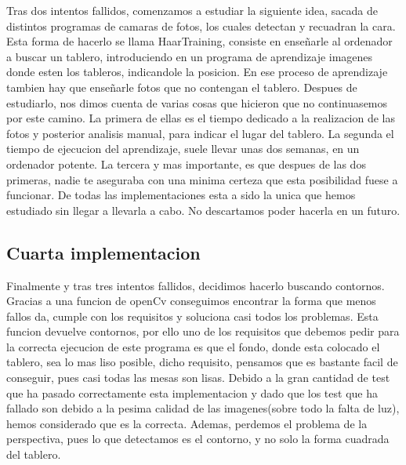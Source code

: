 \documentclass[12pt,a4paper]{report}
\begin{document}
Tras dos intentos fallidos, comenzamos a estudiar la siguiente idea, sacada de distintos programas de camaras de fotos, los cuales detectan y recuadran la cara. 
Esta forma de hacerlo se llama HaarTraining, consiste en enseñarle al ordenador a buscar un tablero, introduciendo en un programa de aprendizaje imagenes donde esten los tableros, indicandole la posicion. En ese proceso de aprendizaje tambien hay que enseñarle fotos que no contengan el tablero.
Despues de estudiarlo, nos dimos cuenta de varias cosas que hicieron que no continuasemos por este camino.
La primera de ellas es el tiempo dedicado a la realizacion de las fotos y posterior analisis manual, para indicar el lugar del tablero.
La segunda el tiempo de ejecucion del aprendizaje, suele llevar unas dos semanas, en un ordenador potente.
La tercera y mas importante, es que despues de las dos primeras, nadie te aseguraba con una minima certeza que esta posibilidad fuese a funcionar.
De todas las implementaciones esta a sido la unica que hemos estudiado sin llegar a llevarla a cabo. No descartamos poder hacerla en un futuro.

\subsection{Cuarta implementacion}

Finalmente y tras tres intentos fallidos, decidimos hacerlo buscando contornos. Gracias a una funcion de openCv conseguimos encontrar la forma que menos fallos da, cumple con los requisitos y soluciona casi todos los problemas.
Esta funcion devuelve contornos, por ello uno de los requisitos que debemos pedir para la correcta ejecucion de este programa es que el fondo, donde esta colocado el tablero, sea lo mas liso posible, dicho requisito, pensamos que es bastante facil de conseguir, pues casi todas las mesas son lisas.
Debido a la gran cantidad de test que ha pasado correctamente esta implementacion y dado que los test que ha fallado son debido a la pesima calidad de las imagenes(sobre todo la falta de luz), hemos considerado que es la correcta. Ademas, perdemos el problema de la perspectiva, pues lo que detectamos es el contorno, y no solo la forma cuadrada del tablero.
\end{document}
